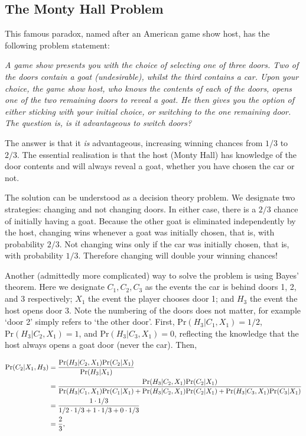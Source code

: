\documentclass[11pt]{amsart}
\begin{document}
\subsection{The Monty Hall Problem}

This famous paradox, named after an American game show host, has the following problem statement:

\emph{A game show presents you with the choice of selecting one of three doors. Two of the doors contain a goat (undesirable), whilst the third contains a car. Upon your choice, the game show host, who knows the contents of each of the doors, opens one of the two remaining doors to reveal a goat. He then gives you the option of either sticking with your initial choice, or switching to the one remaining door. The question is, is it advantageous to switch doors?}

The answer is that it \emph{is} advantageous, increasing winning chances from $1/3$ to $2/3$. The essential realisation is that the host (Monty Hall) has knowledge of the door contents and will always reveal a goat, whether you have chosen the car or not.

The solution can be understood as a decision theory problem. We designate two strategies: changing and not changing doors. In either case, there is a $2/3$ chance of initially having a goat. Because the other goat is eliminated independently by the host, changing wins whenever a goat was initially chosen, that is, with probability $2/3$. Not changing wins only if the car was initially chosen, that is, with probability $1/3$. Therefore changing will double your winning chances!

Another (admittedly more complicated) way to solve the problem is using Bayes' theorem. Here we designate $C_1, C_2, C_3$ as the events the car is behind doors 1, 2, and 3 respectively; $X_1$ the event the player chooses door 1; and $H_3$ the event the host opens door 3. Note the numbering of the doors does not matter, for example `door 2' simply refers to `the other door'. First, $\text{Pr}(H_3|C_1,X_1) = 1/2$, $\text{Pr}(H_3|C_2,X_1) = 1$, and $\text{Pr}(H_3|C_3,X_1) = 0$, reflecting the knowledge that the host always opens a goat door (never the car). Then,

\begin{align}
\text{Pr}(C_2|X_1,H_3) &= \frac{\text{Pr}(H_3|C_2,X_1)\text{Pr}(C_2|X_1)}{\text{Pr}(H_3|X_1)} \notag \\
&= \frac{\text{Pr}(H_3|C_2,X_1)\text{Pr}(C_2|X_1)}{\text{Pr}(H_3|C_1,X_1)\text{Pr}(C_1|X_1) + \text{Pr}(H_3|C_2,X_1)\text{Pr}(C_2|X_1) + \text{Pr}(H_3|C_3,X_1)\text{Pr}(C_3|X_1)} \notag \\
&= \frac{1 \cdot 1/3}{1/2 \cdot 1/3 + 1 \cdot 1/3 + 0 \cdot 1/3} \notag \\
&= \frac{2}{3}, \notag
\end{align}
\end{document}
